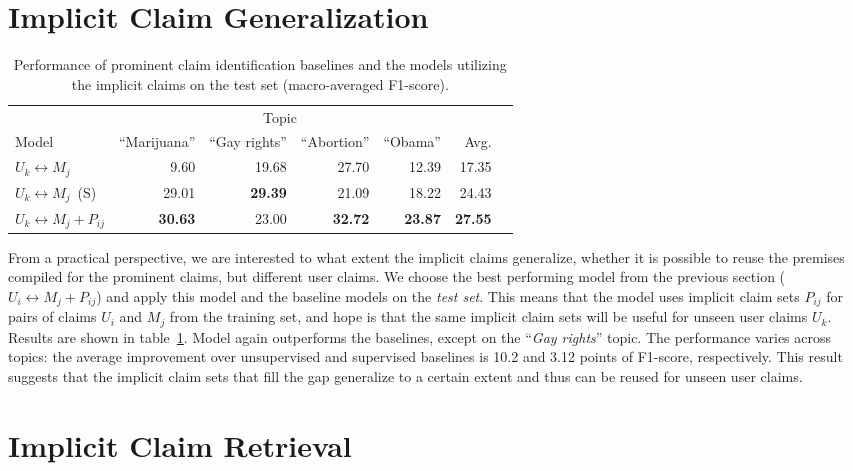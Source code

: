 \section{Implicit Claim Generalization}

\begin{table}[t]
\begin{center}
{\small
\setlength{\tabcolsep}{5.9pt}
\begin{tabular}{lrrrrrr}
\toprule
&\multicolumn{4}{c}{Topic}\\
\cmidrule(lr){2-5}
Model & ``Marijuana'' & ``Gay rights''  & ``Abortion'' & ``Obama'' & Avg. \\
\midrule
$U_k \leftrightarrow M_j$   & 9.60          & 19.68        & 27.70        & 12.39        & 17.35 \\
$U_k \leftrightarrow M_j$\ (S)   & 29.01         & {\bf 29.39}  & 21.09        & 18.22        & 24.43 \\
$U_k \leftrightarrow M_j + P_{ij}$  & {\bf 30.63}   & 23.00        & {\bf 32.72}  & {\bf 23.87}  & {\bf 27.55} \\
\bottomrule
\end{tabular}}
\caption{Performance of prominent claim identification baselines and the models utilizing the
implicit claims on the test set (macro-averaged F1-score).}
\label{tab:argpremise_generalization}
\end{center}
\end{table}

From a practical perspective, we are interested to what extent the implicit claims
generalize, whether it is possible to reuse the premises compiled for the
prominent claims, but different user claims. 
We choose the best performing model from the previous section ($U_i
\leftrightarrow M_j + P_{ij}$)
and apply this model and the baseline models on the \emph{test set}. 
This means that the model uses implicit claim sets $P_{ij}$ for pairs of claims
$U_i$ and $M_j$ from the training set, and hope is that the same implicit claim
sets will be useful for unseen user claims $U_k$. 
Results are shown in table~\ref{tab:argpremise_generalization}. 
Model again outperforms the baselines, except on the ``\emph{Gay rights}'' topic. 
The performance varies across topics: the average improvement over unsupervised
and supervised baselines is 10.2 and 3.12 points of F1-score, respectively. 
This result suggests that the implicit claim sets that fill the gap generalize to a certain
extent and thus can be reused for unseen user claims. 

\section{Implicit Claim Retrieval}

